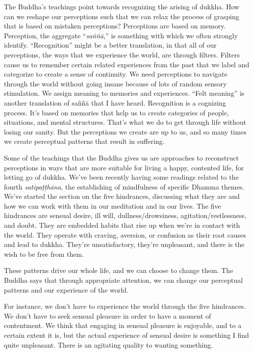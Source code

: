 The Buddha's teachings point towards recognizing the arising of dukkha. How can we reshape our perceptions such that we can relax the process of grasping that is based on mistaken perceptions? Perceptions are based on memory. Perception, the aggregate ``\emph{saññā},'' is something with which we often strongly identify. ``Recognition'' might be a better translation, in that all of our perceptions, the ways that we experience the world, are through filters. Filters cause us to remember certain related experiences from the past that we label and categorize to create a sense of continuity. We need perceptions to navigate through the world without going insane because of lots of random sensory stimulation. We assign meaning to memories and experiences. ``Felt meaning'' is another translation of saññā that I have heard. Recognition is a cognizing process. It's based on memories that help us to create categories of people, situations, and mental structures. That's what we do to get through life without losing our sanity. But the perceptions we create are up to us, and so many times we create perceptual patterns that result in suffering.

Some of the teachings that the Buddha gives us are approaches to reconstruct perceptions in ways that are more suitable for living a happy, contented life, for letting go of dukkha. We've been recently having some readings related to the fourth \emph{satipaṭṭhāna}, the establishing of mindfulness of specific Dhamma themes. We've started the section on the five hindrances, discussing what they are and how we can work with them in our meditation and in our lives. The five hindrances are sensual desire, ill will, dullness/drowsiness, agitation/restlessness, and doubt. They are embedded habits that rise up when we're in contact with the world. They operate with craving, aversion, or confusion as their root causes and lead to dukkha. They're unsatisfactory, they're unpleasant, and there is the wish to be free from them.

These patterns drive our whole life, and we can choose to change them. The Buddha says that through appropriate attention, we can change our perceptual patterns and our experience of the world.

For instance, we don't have to experience the world through the five hindrances. We don't have to seek sensual pleasure in order to have a moment of contentment. We think that engaging in sensual pleasure is enjoyable, and to a certain extent it is, but the actual experience of sensual desire is something I find quite unpleasant. There is an agitating quality to wanting something.

